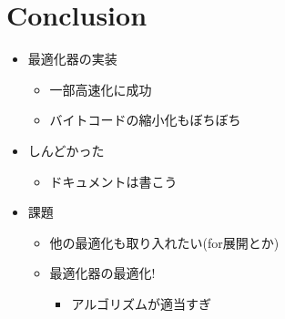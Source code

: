 \section{Conclusion}
\begin{frame}
\frametitlesec
\begin{itemize}
	\item 最適化器の実装
		\begin{itemize}
			\item 一部高速化に成功
			\item バイトコードの縮小化もぼちぼち
		\end{itemize}
	\item しんどかった
		\begin{itemize}
			\item ドキュメントは書こう
		\end{itemize}
	\item 課題
		\begin{itemize}
			\item 他の最適化も取り入れたい(for展開とか)
			\item 最適化器の最適化!
				\begin{itemize}
					\item アルゴリズムが適当すぎ
			\end{itemize}
		\end{itemize}
\end{itemize}
\end{frame}
